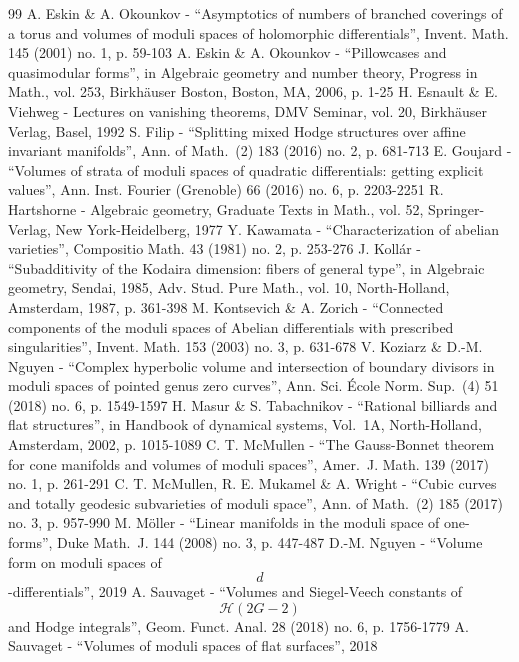 \begin{thebibliography}{99}
 A. Eskin \& A. Okounkov - “Asymptotics of numbers of branched coverings of a torus and volumes of moduli spaces of holomorphic differentials”, Invent. Math. 145 (2001) no. 1, p. 59-103
 A. Eskin \& A. Okounkov - “Pillowcases and quasimodular forms”, in Algebraic geometry and number theory, Progress in Math., vol. 253, Birkhäuser Boston, Boston, MA, 2006, p. 1-25
 H. Esnault \& E. Viehweg - Lectures on vanishing theorems, DMV Seminar, vol. 20, Birkhäuser Verlag, Basel, 1992
 S. Filip - “Splitting mixed Hodge structures over affine invariant manifolds”, Ann. of Math. (2) 183 (2016) no. 2, p. 681-713
 E. Goujard - “Volumes of strata of moduli spaces of quadratic differentials: getting explicit values”, Ann. Inst. Fourier (Grenoble) 66 (2016) no. 6, p. 2203-2251
 R. Hartshorne - Algebraic geometry, Graduate Texts in Math., vol. 52, Springer-Verlag, New York-Heidelberg, 1977
 Y. Kawamata - “Characterization of abelian varieties”, Compositio Math. 43 (1981) no. 2, p. 253-276
 J. Kollár - “Subadditivity of the Kodaira dimension: fibers of general type”, in Algebraic geometry, Sendai, 1985, Adv. Stud. Pure Math., vol. 10, North-Holland, Amsterdam, 1987, p. 361-398
 M. Kontsevich \& A. Zorich - “Connected components of the moduli spaces of Abelian differentials with prescribed singularities”, Invent. Math. 153 (2003) no. 3, p. 631-678
 V. Koziarz \& D.-M. Nguyen - “Complex hyperbolic volume and intersection of boundary divisors in moduli spaces of pointed genus zero curves”, Ann. Sci. École Norm. Sup. (4) 51 (2018) no. 6, p. 1549-1597
 H. Masur \& S. Tabachnikov - “Rational billiards and flat structures”, in Handbook of dynamical systems, Vol. 1A, North-Holland, Amsterdam, 2002, p. 1015-1089
 C. T. McMullen - “The Gauss-Bonnet theorem for cone manifolds and volumes of moduli spaces”, Amer. J. Math. 139 (2017) no. 1, p. 261-291
 C. T. McMullen, R. E. Mukamel \& A. Wright - “Cubic curves and totally geodesic subvarieties of moduli space”, Ann. of Math. (2) 185 (2017) no. 3, p. 957-990
 M. Möller - “Linear manifolds in the moduli space of one-forms”, Duke Math. J. 144 (2008) no. 3, p. 447-487
 D.-M. Nguyen - “Volume form on moduli spaces of $$d$$-differentials”, 2019
 A. Sauvaget - “Volumes and Siegel-Veech constants of $$\mathcal{H}(2G-2)$$ and Hodge integrals”, Geom. Funct. Anal. 28 (2018) no. 6, p. 1756-1779
 A. Sauvaget - “Volumes of moduli spaces of flat surfaces”, 2018

\end{thebibliography}
